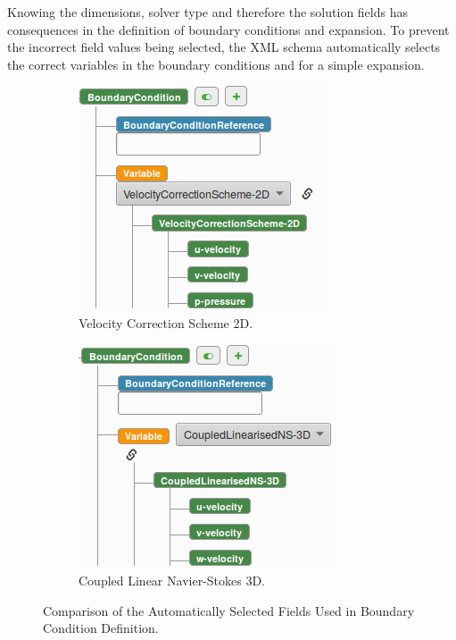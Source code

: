 \documentclass[11pt, a4paper]{report}
\begin{document}
Knowing the dimensions, solver type and therefore the solution fields has consequences in the definition of boundary conditions and expansion. To prevent the incorrect field values being selected, the XML schema automatically selects the correct variables in the boundary conditions and for a simple expansion.

\begin{figure}[!htb]
\centering
\begin{subfigure}{.5\textwidth}
  \centering
  \includegraphics[width=.9\linewidth]{VCS_2D}
  \caption{Velocity Correction Scheme 2D.}
  \label{fig:vcs2d}
\end{subfigure}%
\begin{subfigure}{.5\textwidth}
  \centering
  \includegraphics[width=.9\linewidth]{coupledLinear3D}
  \caption{Coupled Linear Navier-Stokes 3D.}
  \label{fig:coupledlinear3d}
\end{subfigure}
\caption{Comparison of the Automatically Selected Fields Used in Boundary Condition Definition.}
\label{fig:implicit_constraints}
\end{figure}
\end{document}
